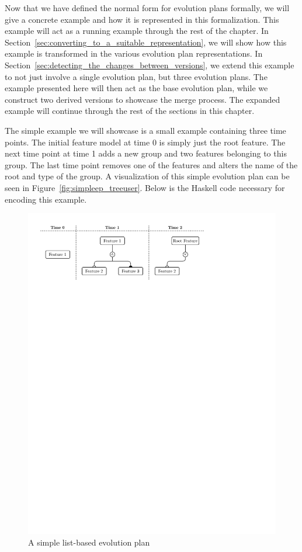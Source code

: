 \documentclass[a4paper,english]{ifimaster}
\begin{document}
Now that we have defined the normal form for evolution plans formally, we will give a concrete example and how it is represented in this formalization. This example will act as a running example through the rest of the chapter. In Section~\vref{sec:converting_to_a_suitable_representation}, we will show how this example is transformed in the various evolution plan representations. In Section~\vref{sec:detecting_the_changes_between_versions}, we extend this example to not just involve a single evolution plan, but three evolution plans. The example presented here will then act as the base evolution plan, while we construct two derived versions to showcase the merge process. The expanded example will continue through the rest of the sections in this chapter.

The simple example we will showcase is a small example containing three time points. The initial feature model at time 0 is simply just the root feature. The next time point at time 1 adds a new group and two features belonging to this group. The last time point removes one of the features and alters the name of the root and type of the group. A visualization of this simple evolution plan can be seen in Figure~\vref{fig:simpleep_treeuser}. Below is the Haskell code necessary for encoding this example.

\begin{figure}[htpb]
  \centering
  \includegraphics[width=\linewidth]{simpleep_treeuser.pdf}
  \caption{A simple list-based evolution plan}%
  \label{fig:simpleep_treeuser}
\end{figure}
\end{document}
